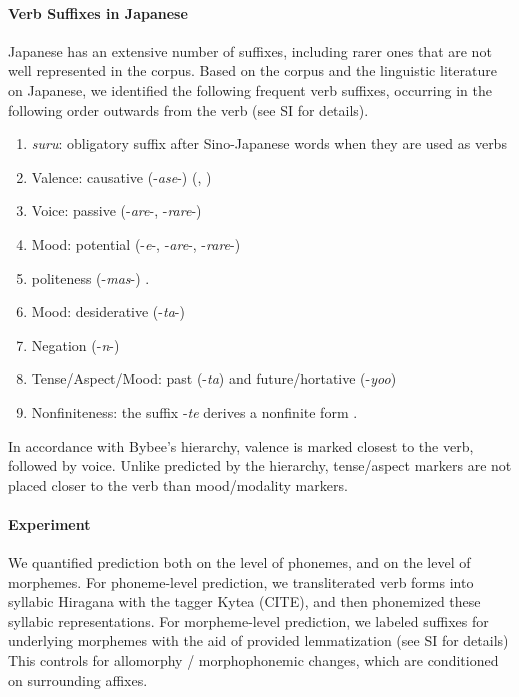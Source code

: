 \paragraph{Verb Suffixes in Japanese}

Japanese has an extensive number of suffixes, including rarer ones that are not well represented in the corpus.
Based on the corpus and the linguistic literature on Japanese, we identified the following frequent verb suffixes, occurring in the following order outwards from the verb (see SI for details).


\begin{enumerate}
\item \textit{suru}: obligatory suffix after Sino-Japanese words when they are used as verbs
\item Valence: causative (-\textit{ase}-) (\citet[142]{hasegawa2014japanese}, \citet[Chapter 13]{kaiser2013japanese})
\item Voice: passive (-\textit{are}-, -\textit{rare}-) \cite[152]{hasegawa2014japanese} \cite[Chapter 12]{kaiser2013japanese}
\item Mood: potential (-\textit{e}-, -\textit{are}-, -\textit{rare}-)  
\item politeness (-\textit{mas}-) \cite[190]{kaiser2013japanese}.
\item Mood: desiderative (-\textit{ta}-) \cite[238]{kaiser2013japanese}
\item Negation (-\textit{n}-)
\item Tense/Aspect/Mood: past (-\textit{ta}) and future/hortative (-\textit{yoo}) \cite[229]{kaiser2013japanese}
\item Nonfiniteness: the suffix -\textit{te} derives a nonfinite form \cite[186]{kaiser2013japanese}.
\end{enumerate}

In accordance with Bybee's hierarchy, valence is marked closest to the verb, followed by voice.
Unlike predicted by the hierarchy, tense/aspect markers are not placed closer to the verb than mood/modality markers.



\paragraph{Experiment}
We quantified prediction both on the level of phonemes, and on the level of morphemes.
For phoneme-level prediction, we transliterated verb forms into syllabic Hiragana with the tagger Kytea (CITE), and then phonemized these syllabic representations.
For morpheme-level prediction, we labeled suffixes for underlying morphemes with the aid of provided lemmatization (see SI for details)
This controls for allomorphy / morphophonemic changes, which are conditioned on surrounding affixes.


